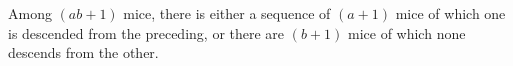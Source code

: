 Among $(ab + 1)$ mice, there is either a sequence of $(a + 1)$ mice of which one is descended from the preceding, or there are $(b + 1)$ mice of which none descends from the other.
